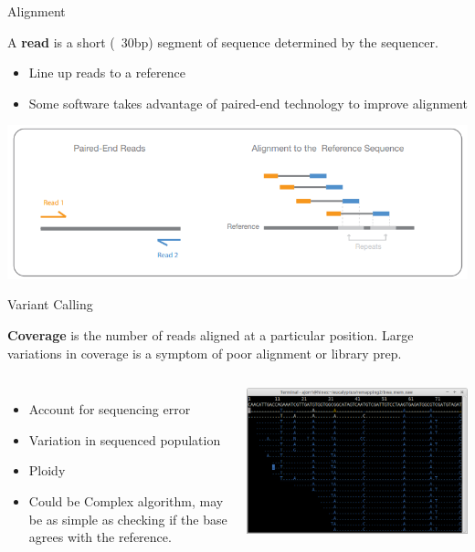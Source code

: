 \documentclass{beamer}
\begin{document}
\begin{frame}{Alignment}
	\begin{definition}
	A \textbf{read} is a short (~30bp) segment of sequence determined by the sequencer.
	\end{definition}

	\begin{itemize}
	\item Line up reads to a reference
	\item Some software takes advantage of paired-end technology to improve alignment
	\end{itemize}
	\includegraphics[width=\linewidth]{figures/pe_sequencing.png}
\end{frame}

\begin{frame}{Variant Calling}
	\begin{definition}
	\textbf{Coverage} is the number of reads aligned at a particular position. Large variations in coverage is a symptom of poor alignment or library prep. 
	\end{definition}

	\begin{columns}
			\begin{itemize}
			\item Account for sequencing error
			\item Variation in sequenced population
			\item Ploidy
			\item Could be Complex algorithm, may be as simple as checking if the base agrees with the reference.
			\end{itemize}
			\includegraphics[width=\linewidth]{figures/coverage.png}
	\end{columns}
\end{frame}
\end{document}
